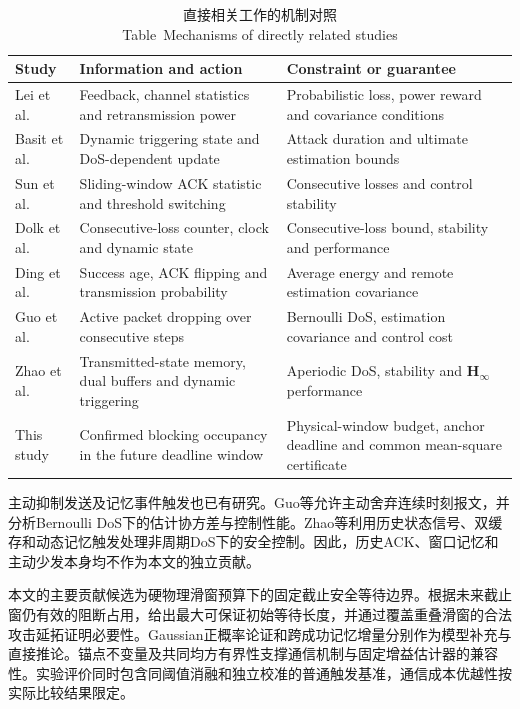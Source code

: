 \documentclass[UTF8,a4paper,zihao=5,fontset=windows]{ctexart}
\begin{document}
\begin{table}[htbp]
\centering\small
\caption{直接相关工作的机制对照\\ Table~\thetable\quad Mechanisms of directly related studies}\label{tab:related}
\begin{tabularx}{\linewidth}{p{25mm}>{\raggedright\arraybackslash}X>{\raggedright\arraybackslash}X}
\toprule
Study & Information and action & Constraint or guarantee\\
\midrule
Lei et al.\cite{Paper_FUS42_2022} & Feedback, channel statistics and retransmission power & Probabilistic loss, power reward and covariance conditions\\
Basit et al.\cite{Paper_FUS37_2023} & Dynamic triggering state and DoS-dependent update & Attack duration and ultimate estimation bounds\\
Sun et al.\cite{Paper_FUS06_Sun2024} & Sliding-window ACK statistic and threshold switching & Consecutive losses and control stability\\
Dolk et al.\cite{Paper_FUS47_2017} & Consecutive-loss counter, clock and dynamic state & Consecutive-loss bound, stability and performance\\
Ding et al.\cite{Paper_FUS48_Ding2016} & Success age, ACK flipping and transmission probability & Average energy and remote estimation covariance\\
Guo et al.\cite{Paper_FUS46_2020} & Active packet dropping over consecutive steps & Bernoulli DoS, estimation covariance and control cost\\
Zhao et al.\cite{Paper_FUS50_Zhao2024} & Transmitted-state memory, dual buffers and dynamic triggering & Aperiodic DoS, stability and ${\bm{H}}_\infty$ performance\\
This study & Confirmed blocking occupancy in the future deadline window & Physical-window budget, anchor deadline and common mean-square certificate\\
\bottomrule
\end{tabularx}
\end{table}

主动抑制发送及记忆事件触发也已有研究。Guo等允许主动舍弃连续时刻报文，并分析Bernoulli DoS下的估计协方差与控制性能\cite{Paper_FUS46_2020}。Zhao等利用历史状态信号、双缓存和动态记忆触发处理非周期DoS下的安全控制\cite{Paper_FUS50_Zhao2024}。因此，历史ACK、窗口记忆和主动少发本身均不作为本文的独立贡献。

本文的主要贡献候选为硬物理滑窗预算下的固定截止安全等待边界。根据未来截止窗仍有效的阻断占用，给出最大可保证初始等待长度，并通过覆盖重叠滑窗的合法攻击延拓证明必要性。Gaussian正概率论证和跨成功记忆增量分别作为模型补充与直接推论。锚点不变量及共同均方有界性支撑通信机制与固定增益估计器的兼容性。实验评价同时包含同阈值消融和独立校准的普通触发基准，通信成本优越性按实际比较结果限定。
\end{document}
